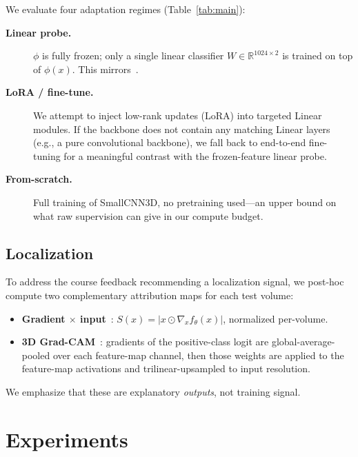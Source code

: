 \documentclass{article}
\begin{document}
We evaluate four adaptation regimes (Table~\ref{tab:main}):
\begin{description}
\item[\textbf{Linear probe.}] $\phi$ is fully frozen; only a single
  linear classifier $W \in \mathbb{R}^{1024 \times 2}$ is trained on top
  of $\phi(x)$. This mirrors~\citet{pai2024_cancer_fm}.
\item[\textbf{LoRA / fine-tune.}] We attempt to inject low-rank updates
  (LoRA) into targeted Linear modules. If the backbone does not contain
  any matching Linear layers (e.g., a pure convolutional backbone), we
  fall back to end-to-end fine-tuning for a meaningful contrast with the
  frozen-feature linear probe.
\item[\textbf{From-scratch.}] Full training of SmallCNN3D, no
  pretraining used---an upper bound on what raw supervision can give in
  our compute budget.
\end{description}

\subsection{Localization}
\label{sec:loc}

To address the course feedback recommending a localization signal, we
post-hoc compute two complementary attribution maps for each test
volume:
\begin{itemize}
\item \textbf{Gradient $\times$ input}~\citep{simonyan2014_saliency}:
  $S(x) = |x \odot \nabla_x f_\theta(x)|$, normalized per-volume.
\item \textbf{3D Grad-CAM}~\citep{selvaraju2017_gradcam}: gradients of
  the positive-class logit are global-average-pooled over each
  feature-map channel, then those weights are applied to the
  feature-map activations and trilinear-upsampled to input resolution.
\end{itemize}
We emphasize that these are explanatory \emph{outputs}, not training
signal.

\section{Experiments}
\end{document}
